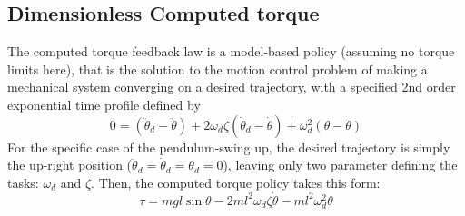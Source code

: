 \subsection{Dimensionless Computed torque}

The computed torque feedback law is a model-based policy (assuming no torque limits here), that is the solution to the motion control problem of making a mechanical system converging on a desired trajectory, with a specified 2nd order exponential time profile defined by
\begin{equation}
0 = (\ddot{\theta}_d - \ddot{\theta})+ 2 \omega_d \zeta (\dot{\theta}_d - \dot{\theta}) + \omega_d^2 (\theta - \theta)
\end{equation}
For the specific case of the pendulum-swing up, the desired trajectory is simply the up-right position ($\ddot{\theta}_d = \dot{\theta}_d = \theta_d = 0$), leaving only two parameter defining the tasks: $\omega_d$ and $\zeta$. Then, the computed torque policy takes this form:
\begin{equation}
\tau = mgl \sin \theta - 2 m l^2 \omega_d \zeta \dot{\theta} - m l^2 \omega_d^2 \theta
\label{eq:ct}
\end{equation}


